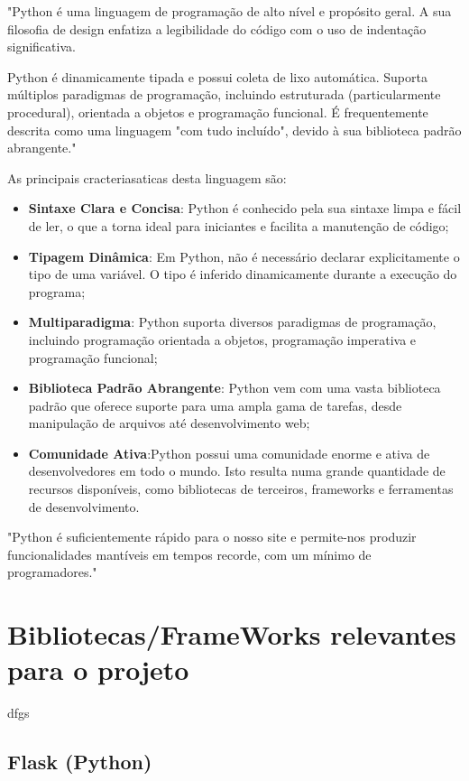"Python é uma linguagem de programação de alto nível e propósito geral. A sua filosofia
de design enfatiza a legibilidade do código com o uso de indentação significativa.

Python é dinamicamente tipada e possui coleta de lixo automática. 
Suporta múltiplos paradigmas de programação, incluindo estruturada (particularmente 
procedural), orientada a objetos e programação funcional. É frequentemente descrita como 
uma linguagem "com tudo incluído", devido à sua biblioteca padrão abrangente." \cite{python}



As principais cracteriasaticas desta linguagem são:

\begin{itemize}
\item \textbf{Sintaxe Clara e Concisa}: Python é conhecido pela sua sintaxe limpa
e fácil de ler, o que a torna ideal para iniciantes e facilita a manutenção de código;
\item \textbf{Tipagem Dinâmica}: Em Python, não é necessário declarar explicitamente o
tipo de uma variável. O tipo é inferido dinamicamente durante a execução do programa;
\item \textbf{Multiparadigma}: Python suporta diversos paradigmas de programação,
incluindo programação orientada a objetos, programação imperativa e programação funcional;
\item \textbf{Biblioteca Padrão Abrangente}: Python vem com uma vasta biblioteca 
padrão que oferece suporte para uma ampla gama de tarefas, desde manipulação de arquivos 
até desenvolvimento web;
\item \textbf{Comunidade Ativa}:Python possui uma comunidade enorme e ativa de 
desenvolvedores em todo o mundo. Isto resulta numa grande quantidade
de recursos disponíveis, como bibliotecas de terceiros, frameworks e ferramentas 
de desenvolvimento.
\end{itemize}


"Python é suficientemente rápido para o nosso site e permite-nos produzir funcionalidades 
mantíveis em tempos recorde, com um mínimo de programadores." \cite{pyyt}


\section{Bibliotecas/FrameWorks relevantes para o projeto}

dfgs

\subsection{Flask (Python)}


